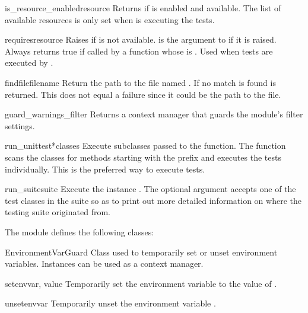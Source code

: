 \begin{funcdesc}{is_resource_enabled}{resource}
Returns  if  is enabled and available.
The list of available resources is only set when 
is executing the tests.
\end{funcdesc}

\begin{funcdesc}{requires}{resource}
Raises  if  is not available.
 is the argument to  if it is raised.
Always returns true if called by a function whose  is
.
Used when tests are executed by .
\end{funcdesc}

\begin{funcdesc}{findfile}{filename}
Return the path to the file named .
If no match is found  is returned.
This does not equal a failure since it could be the path to the file.
\end{funcdesc}

\begin{funcdesc}{guard_warnings_filter}{}
Returns a context manager that guards the  module's
filter settings.
\end{funcdesc}

\begin{funcdesc}{run_unittest}{*classes}
Execute  subclasses passed to the function.
The function scans the classes for methods starting with the prefix
 and executes the tests individually.
This is the preferred way to execute tests.
\end{funcdesc}

\begin{funcdesc}{run_suite}{suite}
Execute the  instance .
The optional argument  accepts one of the test classes in the
suite so as to print out more detailed information on where the testing suite
originated from.
\end{funcdesc}

The  module defines the following classes:

\begin{classdesc}{EnvironmentVarGuard}{}
Class used to temporarily set or unset environment variables.  Instances can be
used as a context manager.
\end{classdesc}

\begin{methoddesc}{set}{envvar, value}
Temporarily set the environment variable  to the value of
.
\end{methoddesc}

\begin{methoddesc}{unset}{envvar}
Temporarily unset the environment variable .
\end{methoddesc}

